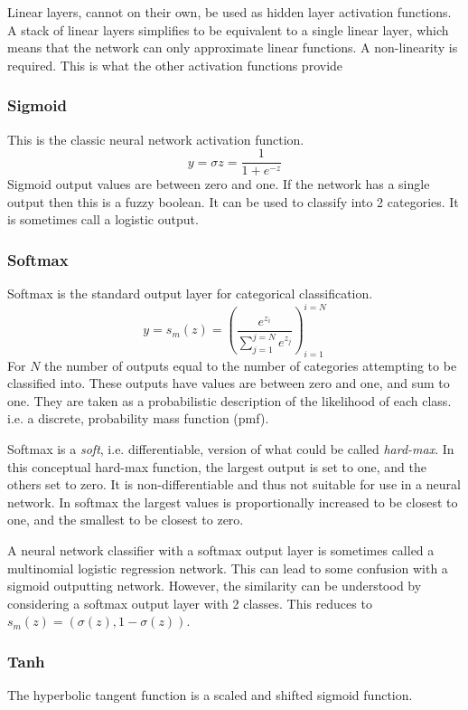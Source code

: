 \documentclass[12pt,parskip]{komatufte}
\begin{document}
Linear layers, cannot on their own, be used as hidden layer activation functions.
A stack of linear layers simplifies to be equivalent to a single linear layer, which means that the network can only approximate linear functions.
A non-linearity is required.
This is what the other activation functions provide


\subsubsection{Sigmoid}
This is the classic neural network activation function.
\begin{equation}
y=\sigma{z}=\frac{1}{1+e^{-z}}
\end{equation}
Sigmoid output values are between zero and one.
If the network has a single output then this is a fuzzy boolean.
It can be used to classify into 2 categories.
It is sometimes call a logistic output.

\subsubsection{Softmax}
Softmax is the standard output layer for categorical classification.
\begin{equation}
y=s_m(z)=\left( \frac{e^{z_i}}{\sum_{j=1}^{j=N} e^{z_j}} \right)_{i=1}^{i=N}
\end{equation}
For $N$ the number of outputs equal to the number of categories attempting to be classified into.
These outputs have  values are between zero and one, and sum to one.
They are taken as a probabilistic description of the likelihood of each class.
i.e. a discrete, probability mass function (pmf).


Softmax is a \emph{soft}, i.e. differentiable,  version of what could be called \emph{hard-max}.
In this conceptual hard-max function, the largest output is set to one, and the others set to zero.
It is non-differentiable and thus not suitable for use in a neural network.
In softmax the largest values is proportionally increased to be closest to one,
and the smallest to be closest to zero.

A neural network classifier with a softmax output layer is sometimes called a multinomial logistic regression network.
This can lead to some confusion with a sigmoid outputting network.
However, the similarity can be understood by considering a softmax output layer with 2 classes.
This reduces to $s_m(z)= \left( \sigma(z), 1-\sigma(z) \right)$.


\subsubsection{Tanh}
The hyperbolic tangent function is a  scaled and shifted sigmoid function.
\end{document}
